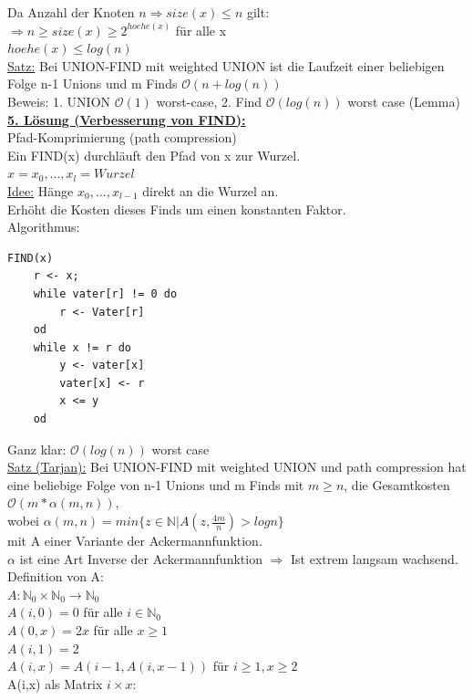 \documentclass[a4paper]{article}
\newcommand{\oh}[1]{$\mathcal{O}(#1)$}
\begin{document}
Da Anzahl der Knoten $n \Rightarrow size(x) \leq n$ gilt:\\
\hspace*{1cm}$\Rightarrow n\geq size(x)\geq 2^{hoehe(x)}$ für alle x\\
\hspace*{1cm}$hoehe(x) \leq log(n)$\\
\underline{Satz:} Bei UNION-FIND mit weighted UNION ist die Laufzeit einer beliebigen Folge n-1 Unions und m Finds \oh{n+log(n)}\\
Beweis: 1. UNION \oh{1} worst-case, 2. Find \oh{log(n)} worst case (Lemma)\\
\underline{\textbf{5. Lösung (Verbesserung von FIND):}}\\
Pfad-Komprimierung (path compression)\\
Ein FIND(x) durchläuft den Pfad von x zur Wurzel.\\
$x=x_0,...,x_l=Wurzel$\\
\underline{Idee:} Hänge $x_0,...,x_{l-1}$ direkt an die Wurzel an.\\
Erhöht die Kosten dieses Finds um einen konstanten Faktor.\\
Algorithmus:
\begin{lstlisting}
FIND(x)
	r <- x;
	while vater[r] != 0 do 
		r <- Vater[r]
	od
	while x != r do
		y <- vater[x]
		vater[x] <- r
		x <= y
	od	
\end{lstlisting}
Ganz klar: \oh{log(n)} worst case\\
\underline{Satz (Tarjan):} Bei UNION-FIND mit weighted UNION und path compression hat eine beliebige Folge von n-1 Unions und m Finds mit $m\geq n$, die Gesamtkosten \oh{m*\alpha(m,n)}, \\wobei $\alpha(m,n) = min\lbrace z\in \mathbb{N} | A(z,\frac{4m}{n}) > log n\rbrace$\\
mit A einer Variante der Ackermannfunktion.\\
$\alpha$ ist eine Art Inverse der Ackermannfunktion $\Rightarrow$ Ist extrem langsam wachsend.\\
Definition von A:\\
$A: \mathbb{N}_0\times\mathbb{N}_0 \rightarrow \mathbb{N}_0$\\
$A(i,0) = 0$ für alle $i\in\mathbb{N}_0$\\
$A(0,x) = 2x$ für alle $x\geq 1$\\
$A(i,1) = 2$\\
$A(i,x) = A(i-1,A(i,x-1))$ für $i\geq 1,x\geq 2$\\
A(i,x) als Matrix $i\times x$: 
\end{document}
